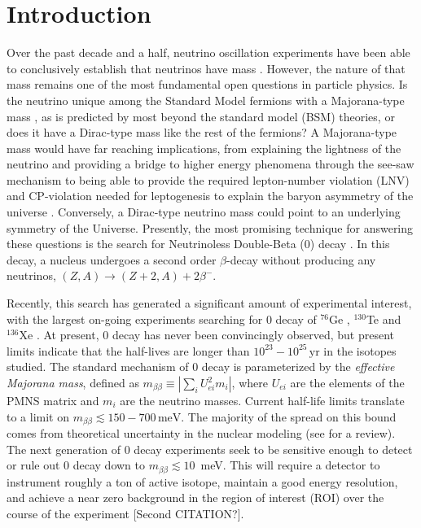 \section{Introduction}

Over the past decade and a half, neutrino oscillation experiments have
been able to conclusively establish that neutrinos have mass
\cite{SNO2001,SNO2002,SuperK2002,kamland2003}. However, the nature of
that mass remains one of the most fundamental open questions in
particle physics. Is the neutrino unique among the Standard Model
fermions with a Majorana-type mass \cite{Majorana1937}, as is
predicted by most beyond the standard model (BSM) theories, or does it
have a Dirac-type mass like the rest of the fermions? A Majorana-type
mass would have far reaching implications, from explaining the
lightness of the neutrino and providing a bridge to higher energy
phenomena through the see-saw mechanism
\cite{GellMann1980,Yanagida1979} to being able to provide the required
lepton-number violation (LNV) and {\sf CP}-violation needed for
leptogenesis to explain the baryon asymmetry of the universe
\cite{Fukugita1986,Luty1992}. Conversely, a Dirac-type neutrino mass
could point to an underlying symmetry of the Universe.  Presently, the
most promising technique for answering these questions is the search
for Neutrinoless Double-Beta (0\nbb) decay \cite{Furry1939}. In this
decay, a nucleus undergoes a second order $\beta$-decay without
producing any neutrinos, $(Z,A)\rightarrow(Z+2,A)+2\beta^-$. 

Recently, this search has generated a significant amount of
experimental interest, with the largest on-going experiments searching
for {0\nbb} decay of $^{76}$Ge \cite{GERDA2013}, $^{130}$Te
\cite{CUORE2015,CUORE2016} and $^{136}$Xe
\cite{EXO2014,KamLANDZen2013}. At present, 0{\nbb} decay has never
been convincingly observed, but present limits indicate that the
half-lives are longer than $10^{23}-10^{25}\,\mathrm{yr}$ in the
isotopes studied. The standard mechanism of 0{\nbb} decay is
parameterized by the \emph{effective Majorana mass}, defined as
\mbox{$m_{\beta\beta}\equiv\left|\sum_i U^2_{ei}m_i\right|$}, where
$U_{ei}$ are the elements of the PMNS matrix and $m_i$ are the
neutrino masses. Current half-life limits translate to a limit on
\mbox{$m_{\beta\beta}\lesssim 150-700\,\mathrm{meV}$}. The majority of
the spread on this bound comes from theoretical uncertainty in the
nuclear modeling (see \cite{Vogel2012} for a review). The next
generation of 0{\nbb} decay experiments seek to be sensitive enough to
detect or rule out 0{\nbb} decay down to \mbox{$m_{\beta\beta}\lesssim
  10$~meV}. This will require a detector to instrument roughly a ton
of active isotope, maintain a good energy resolution, and achieve a
near zero background in the region of interest (ROI) over the course
of the experiment \cite{Cremonesi2013} [Second CITATION?].


